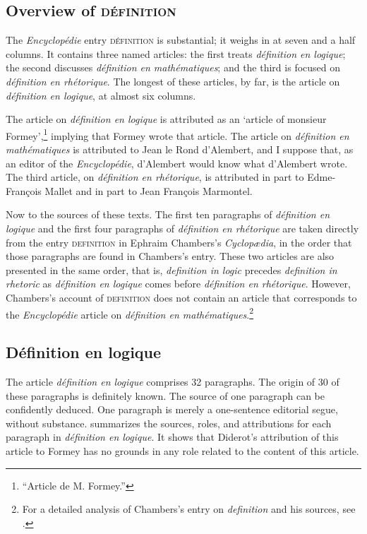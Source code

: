 \documentclass[output=paper]{langscibook}
\begin{document}
\subsection{Overview of \textsc{définition}}
The \emph{Encyclopédie} entry \textsc{définition} is substantial; it weighs in at seven and a half columns. It contains three named articles: the first treats \emph{définition en logique}; the second discusses \emph{définition en mathématiques}; and the third is focused on \emph{définition en rhétorique}. The longest of these articles, by far, is the article on \emph{définition en logique}, at almost six columns.

The article on \emph{définition en logique} is attributed as an ‘article of monsieur Formey’,\footnote{“Article de M. Formey.”}  implying that Formey wrote that article. The article on \emph{définition en mathématiques} is attributed to Jean le Rond d’Alembert, and I suppose that, as an editor of the \emph{Encyclopédie}, d’Alembert would know what d’Alembert wrote. The third article, on \emph{définition en rhétorique}, is attributed in part to Edme-François Mallet and in part to Jean François Marmontel.

Now to the sources of these texts. The first ten paragraphs of \emph{définition en logique} and the first four paragraphs of \emph{définition en rhétorique} are taken directly from the entry  \textsc{definition} in Ephraim Chambers’s \emph{Cyclopædia}, in the order that those paragraphs are found in Chambers’s entry. These two articles are also presented in the same order, that is, \emph{definition in logic} precedes \emph{definition in rhetoric} as \emph{définition en logique} comes before \emph{définition en rhétorique}. However, Chambers’s account of \textsc{definition} does not contain an article that corresponds to the \emph{Encyclopédie} article on \emph{définition en mathématiques}.\footnote{For a detailed analysis of Chambers’s entry on \emph{definition} and his sources, see \citet{Bocast2016}.} 

\subsection{Définition en logique}
The article \emph{définition en logique} comprises 32 paragraphs. The origin of 30 of these paragraphs is definitely known. The source of one paragraph can be confidently deduced. One paragraph is merely a one-sentence editorial segue, without substance.  summarizes the sources, roles, and attributions for each paragraph in \emph{définition en logique}. It shows that Diderot’s attribution of this article to Formey has no grounds in any role related to the content of this article.
\end{document}
